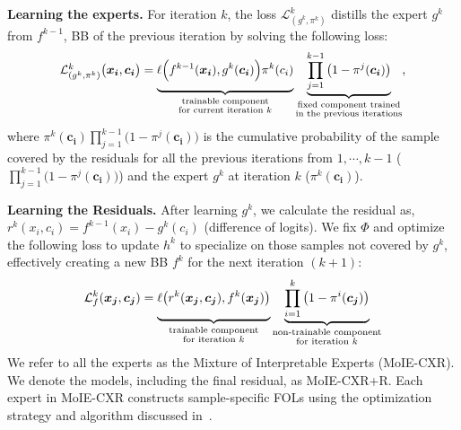 \noindent \textbf{Learning the experts.}
\label{learn_explert}
For iteration $k$, the loss $\mathcal{L}_{(g^k, \pi^k)}^k$ distills the expert $g^k$ from $f^{k-1}$, BB of the previous iteration by solving the following loss:
\begin{equation}
\label{equ: g_k}
\resizebox{0.8\textwidth}{!}{$
\mathcal{L}_{(g^k, \pi^k)}^k\big(\boldsymbol{x_i}, \boldsymbol{c_i}\big) = \underbrace{\mystrut{2.6ex}\ell\Big(f^{k - 1}(\boldsymbol{x_i}), g^k(\boldsymbol{c_i})\Big)\pi^k(c_i) }_{\substack{\text{trainable component} \\ \text{for current iteration $k$}}}\underbrace{\prod_{j=1} ^{k - 1}\big(1 - \pi^j(\boldsymbol{c_i})\big)}_{\substack{\text{fixed component trained} \\ \text{in the previous iterations}}},
$}
\end{equation}
where $\pi^k(\boldsymbol{c_i})\prod_{j=1} ^{k - 1}\big(1 - \pi^j(\boldsymbol{c_i}) \big)$ is the cumulative probability of the sample covered by the residuals for all the previous iterations from $1, \cdots, k-1$ (\ie $\prod_{j=1} ^{k - 1}\big(1 - \pi^j(\boldsymbol{c_i}) \big)$\big) and the expert $g^k$ at iteration $k$ \big(\ie $\pi^k(\boldsymbol{c_i})$\big). 

\noindent \textbf{Learning the Residuals.}
After learning $g^k$, we calculate the residual as, $r^k (x_i, c_i) = f^{k-1}(x_i) - g^k(c_i)$ (difference of logits). We fix $\Phi$ and optimize the following loss to update $h^k$ to specialize on those samples not covered by $g^k$, effectively creating a new BB $f^k$ for the next iteration $(k+1)$:
\begin{equation}
\label{equ: residual}
\mathcal{L}_f^k(\boldsymbol{x_j}, \boldsymbol{c_j}) = \underbrace{\mystrut{2.6ex}\ell\big(r^k(\boldsymbol{x_j}, \boldsymbol{c_j}), f^k(\boldsymbol{x_j})\big)}_{\substack{\text{trainable component} \\ \text{for iteration $k$}}} \underbrace{\mystrut{2.6ex}\prod_{i=1} ^{k}\big(1 - \pi^i(\boldsymbol{c_j})\big)}_{\substack{\text{non-trainable component} \\ \text{for iteration $k$}}}
\end{equation}
 We refer to all the experts as the Mixture of Interpretable Experts (MoIE-CXR). We denote the models, including the final residual, as MoIE-CXR+R. Each expert in MoIE-CXR constructs sample-specific FOLs using the optimization strategy and algorithm discussed in~\cite{ghosh2023route}.

